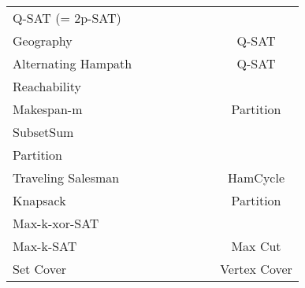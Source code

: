 \documentclass[a4paper, 11pt]{article}
\begin{document}
\begin{figure}[h!]
\begin{tabular}{lccccccc}
			Q-SAT (= 2p-SAT) & & & & & & \checkmark &  \\
			Geography & & & & & & \checkmark & Q-SAT\\
			Alternating Hampath & & & & & & \checkmark & Q-SAT \\
			Reachability\footnotemark[2] & \checkmark & & & & \checkmark & & \\
			Makespan-m & & \checkmark & \checkmark & & \checkmark & &  Partition\\
			SubsetSum & & \checkmark & \checkmark & & \checkmark & & \\
			Partition & & \checkmark & \checkmark & & \checkmark & & \\
			Traveling Salesman & & \checkmark & \checkmark & & \checkmark & & HamCycle\\
			Knapsack & & \checkmark & \checkmark & & \checkmark & & Partition\\
			Max-k-xor-SAT & & \checkmark & \checkmark & & \checkmark & & \\
			Max-k-SAT & & \checkmark & \checkmark & & \checkmark & & Max Cut\\
			Set Cover & & \checkmark & \checkmark & & \checkmark & & Vertex Cover\\
			\bottomrule
		\end{tabular}
	\end{figure}
\end{document}
